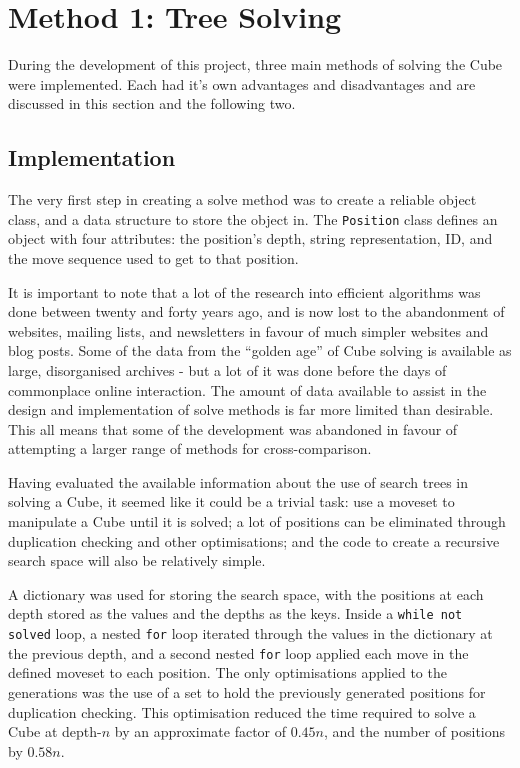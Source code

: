 \documentclass{report}
\newcommand{\depth}[1]{depth-#1}
\newenvironment{aside}{\begin{mdframed}[style=0,%
		leftline=false,rightline=false,leftmargin=2em,rightmargin=2em,%
		innerleftmargin=0pt,innerrightmargin=0pt,linewidth=0.75pt,%
		skipabove=7pt,skipbelow=7pt]\small}
	{\end{mdframed}}
\begin{document}
    \section{Method 1: Tree Solving} \label{sec:treeSolving}
    
    During the development of this project, three main methods of solving the Cube were implemented. Each had it's own advantages and disadvantages and are discussed in this section and the following two.
    
    \subsection{Implementation} \label{sec:treeSolveImplementation}
    
    The very first step in creating a solve method was to create a reliable object class, and a data structure to store the object in. The \lstinline|Position| class defines an object with four attributes: the position's depth, string representation, ID, and the move sequence used to get to that position.
    
   	\begin{aside}
   		    It is important to note that a lot of the research into efficient algorithms was done between twenty and forty years ago, and is now lost to the abandonment of websites, mailing lists, and newsletters in favour of much simpler websites and blog posts. Some of the data from the \enquote{golden age} of Cube solving is available as large, disorganised archives - but a lot of it was done before the days of commonplace online interaction. The amount of data available to assist in the design and implementation of solve methods is far more limited than desirable. This all means that some of the development was abandoned in favour of attempting a larger range of methods for cross-comparison.
   	\end{aside}

    Having evaluated the available information about the use of search trees in solving a Cube, it seemed like it could be a trivial task: use a moveset to manipulate a Cube until it is solved; a lot of positions can be eliminated through duplication checking and other optimisations; and the code to create a recursive search space will also be relatively simple. 
    
    A dictionary was used for storing the search space, with the positions at each depth stored as the values and the depths as the keys. Inside a \lstinline|while not solved| loop, a nested \lstinline|for| loop iterated through the values in the dictionary at the previous depth, and a second nested \lstinline|for| loop applied each move in the defined moveset to each position. The only optimisations applied to the generations was the use of a set to hold the previously generated positions for duplication checking. This optimisation reduced the time required to solve a Cube at \depth{$n$} by an approximate factor of $0.45n$, and the number of positions by $0.58n$.
    
\end{document}
